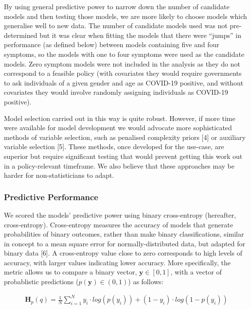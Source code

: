\documentclass[]{elsarticle} %
\begin{document}
By using general predictive power to narrow down the number of candidate models and then testing those models, we are more likely to choose models which generalise well to new data.
The number of candidate models used was not pre-determined but it was clear when fitting the models that there were ``jumps'' in performance (as defined below) between models containing five and four symptoms, so the models with one to four symptoms were used as the candidate models.
Zero symptom models were not included in the analysis as they do not correspond to a feasible policy (with covariates they would require governments to ask individuals of a given gender and age as COVID-19 positive, and without covariates they would involve randomly assigning individuals as COVID-19 positive).

Model selection carried out in this way is quite robust.
However, if more time were available for model development we would advocate more sophisticated methods of variable selection, such as penalised complexity priors {[}4{]} or auxiliary variable selection {[}5{]}.
These methods, once developed for the use-case, are superior but require significant testing that would prevent getting this work out in a policy-relevant timeframe.
We also believe that these approaches may be harder for non-statisticians to adapt.

\hypertarget{predictive-performance}{%
\subsubsection{Predictive Performance}\label{predictive-performance}}

We scored the models' predictive power using binary cross-entropy (hereafter, cross-entropy).
Cross-entropy measures the accuracy of models that generate probabilities of binary outcomes, rather than make binary classifications, similar in concept to a mean square error for normally-distributed data, but adapted for binary data {[}6{]}.
A cross-entropy value close to zero corresponds to high levels of accuracy, with larger values indicating lower accuracy.
More specifically, the metric allows us to compare a binary vector, \(\boldsymbol{y}\in [0,1]\), with a vector of probablistic predictions (\(p(\boldsymbol{y})\in (0,1)\)) as follows:

\begin{equation}\begin{aligned}
\boldsymbol{H}_p(q)=\frac{1}{N}\sum_{i=1}^{N}y_i\cdot log(p(y_i))+(1-y_i)\cdot log(1-p(y_i))
\label{eq:CrossEntropy}
\end{aligned}\end{equation}\ignorespacesafterend
\end{document}
